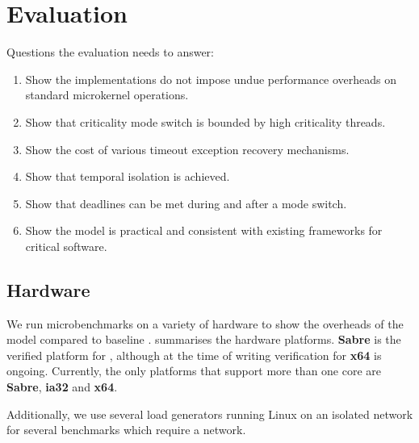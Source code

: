 \chapter{Evaluation}
\label{chap:evaluation}

Questions the evaluation needs to answer:

\begin{enumerate}
\item Show the implementations do not impose undue performance overheads on standard microkernel
operations.
\item Show that criticality mode switch is bounded by high criticality threads.
\item Show the cost of various timeout exception recovery mechanisms.
\item Show that temporal isolation is achieved.
\item Show that deadlines can be met during and after a mode switch.
\item Show the model is practical and consistent with existing frameworks for critical software.
\end{enumerate}

\section{Hardware}

We run microbenchmarks on a variety of hardware to show the overheads of the model compared to
baseline \selfour.  summarises the hardware platforms. \textbf{Sabre} is
the verified platform for \selfour, although at the time of writing verification for \textbf{x64} is
ongoing. Currently, the only platforms that support more than one core are \textbf{Sabre},
\textbf{ia32} and \textbf{x64}.

Additionally, we use several load generators running Linux on an isolated network for several
benchmarks which require a network.

